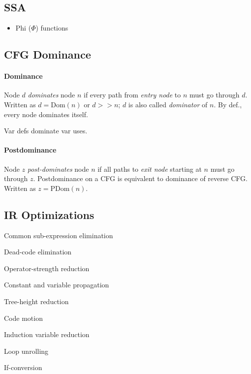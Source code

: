 \documentclass[a4paper]{article}
\begin{document}
\subsection{SSA}

\begin{itemize}
    \item Phi ($\Phi$) functions
\end{itemize}

\subsection{CFG Dominance}

\paragraph{Dominance}
Node $d$ \emph{dominates} node $n$ if every path from \emph{entry node} to $n$ must go through $d$. Written as $d = \text{Dom}(n)$ or $d >> n$; $d$ is also called \emph{dominator} of $n$. By def., every node dominates itself.

Var defs dominate var uses.

\paragraph{Postdominance}
Node $z$ \emph{post-dominates} node $n$ if all paths to \emph{exit node} starting at $n$ must go through $z$. Postdominance on a CFG is equivalent to dominance of reverse CFG. Written as $z = \text{PDom}(n)$.

\subsection{IR Optimizations}

\begin{itemize*}
    \item Common sub-expression elimination
    \item Dead-code elimination
    \item Operator-strength reduction
    \item Constant and variable propagation
    \item Tree-height reduction
    \item Code motion
    \item Induction variable reduction
    \item Loop unrolling
    \item If-conversion
\end{itemize*}
\end{document}
